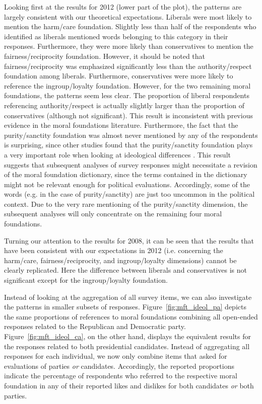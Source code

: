 \documentclass[12pt]{article}
\begin{document}
Looking first at the results for 2012 (lower part of the plot), the patterns are largely consistent with our theoretical expectations. Liberals were most likely to mention the harm/care foundation. Slightly less than half of the respondents who identified as liberals mentioned words belonging to this category in their responses. Furthermore, they were more likely than conservatives to mention the fairness/reciprocity foundation. However, it should be noted that fairness/reciprocity was emphasized significantly less than the authority/respect foundation among liberals. Furthermore, conservatives were more likely to reference the ingroup/loyalty foundation. However, for the two remaining moral foundations, the patterns seem less clear. The proportion of liberal respondents referencing authority/respect is actually slightly larger than the proportion of conservatives (although not significant). This result is inconsistent with previous evidence in the moral foundations literature. Furthermore, the fact that the purity/sanctity foundation was almost never mentioned by any of the respondents is surprising, since other studies found that the purity/sanctity foundation plays a very important role when looking at ideological differences \citep{koleva2012tracing}. This result suggests that subsequent analyses of survey responses might necessitate a revision of the moral foundation dictionary, since the terms contained in the dictionary might not be relevant enough for political evaluations. Accordingly, some of the words (e.g. in the case of purity/sanctity) are just too uncommon in the political context. Due to the very rare mentioning of the purity/sanctity dimension, the subsequent analyses will only concentrate on the remaining four moral foundations.

Turning our attention to the results for 2008, it can be seen that the results that have been consistent with our expectations in 2012 (i.e. concerning the harm/care, fairness/reciprocity, and ingroup/loyalty dimensions) cannot be clearly replicated. Here the difference between liberals and conservatives is not significant except for the ingroup/loyalty foundation.

Instead of looking at the aggregation of all survey items, we can also investigate the patterns in smaller subsets of responses. Figure~\ref{fig:mft_ideol_pa} depicts the same proportions of references to moral foundations combining all open-ended responses related to the Republican and Democratic party. Figure~\ref{fig:mft_ideol_ca}, on the other hand, displays the equivalent results for the responses related to both presidential candidates. Instead of aggregating all responses for each individual, we now only combine items that asked for evaluations of parties \textit{or} candidates. Accordingly, the reported proportions indicate the percentage of respondents who referred to the respective moral foundation in any of their reported likes and dislikes for both candidates \textit{or} both parties.
\end{document}
